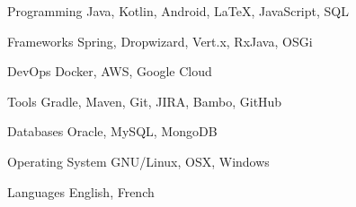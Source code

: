 

\begin{cvskills}

  \cvskill
    {Programming} %
    {Java, Kotlin, Android, \LaTeX, JavaScript, SQL} %

  \cvskill
    {Frameworks} %
    {Spring, Dropwizard, Vert.x, RxJava, OSGi} %
    
  \cvskill
    {DevOps} %
    {Docker, AWS, Google Cloud} %

  \cvskill
    {Tools} %
    {Gradle, Maven, Git, JIRA, Bambo, GitHub} %

  \cvskill
    {Databases} %
    {Oracle, MySQL, MongoDB} %

  \cvskill
    {Operating System} %
    {GNU/Linux, OSX, Windows} %

  \cvskill
    {Languages} %
    {English, French} %

\end{cvskills}
